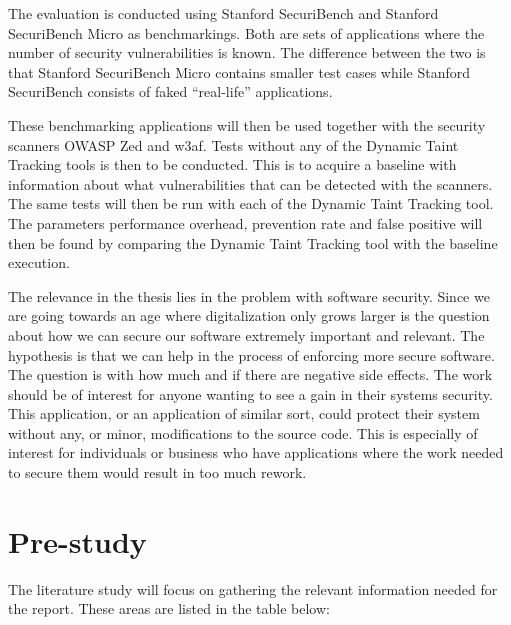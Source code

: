 \documentclass{../kththesis}
\begin{document}
	The evaluation is conducted using Stanford SecuriBench \parencite{securiBench} and Stanford SecuriBench Micro \parencite{securiBenchMicro} as benchmarkings. Both are sets of applications where the number of security vulnerabilities is known. The difference between the two is that Stanford SecuriBench Micro contains smaller test cases while Stanford SecuriBench consists of faked “real-life” applications.

	These benchmarking applications will then be used together with the security scanners OWASP Zed and w3af. Tests without any of the Dynamic Taint Tracking tools is then to be conducted. This is to acquire a baseline with information about what vulnerabilities that can be detected with the scanners. The same tests will then be run with each of the Dynamic Taint Tracking tool. The parameters performance overhead, prevention rate and false positive will then be found by comparing the Dynamic Taint Tracking tool with the baseline execution.

	The relevance in the thesis lies in the problem with software security. Since we are going towards an age where digitalization only grows larger is the question about how we can secure our software extremely important and relevant. The hypothesis is that we can help in the process of enforcing more secure software. The question is with how much and if there are negative side effects. The work should be of interest for anyone wanting to see a gain in their systems security. This application, or an application of similar sort, could protect their system without any, or minor, modifications to the source code. This is especially of interest for individuals or business who have applications where the work needed to secure them would result in too much rework.
	
	
	
	\chapter{Pre-study} \label{Pre-study}
	The literature study will focus on gathering the relevant information needed for the report. These areas are listed in the table below:
		
\end{document}
